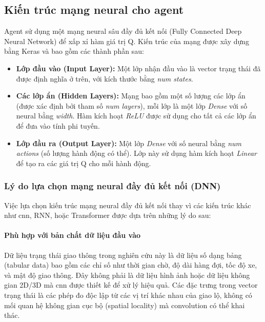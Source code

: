 \subsection{Kiến trúc mạng neural cho agent}

Agent sử dụng một mạng neural sâu đầy đủ kết nối (Fully Connected Deep Neural Network) để xấp xỉ hàm giá trị Q. Kiến trúc của mạng được xây dựng bằng Keras và bao gồm các
thành phần sau:

\begin{itemize}
    \item \textbf{Lớp đầu vào (Input Layer):} Một lớp nhận đầu vào là vector
        trạng thái đã được định nghĩa ở trên, với kích thước bằng \textit{num
        states}.

    \item \textbf{Các lớp ẩn (Hidden Layers):} Mạng bao gồm một số lượng các lớp
        ẩn (được xác định bởi tham số \textit{num layers}), mỗi lớp là một lớp
        \textit{Dense} với số neural bằng \textit{width}. Hàm kích hoạt \textit{ReLU}
        được sử dụng cho tất cả các lớp ẩn để đưa vào tính phi tuyến.

    \item \textbf{Lớp đầu ra (Output Layer):} Một lớp \textit{Dense} với số neural
        bằng \textit{num actions} (số lượng hành động có thể). Lớp này sử dụng hàm
        kích hoạt \textit{Linear} để tạo ra các giá trị Q cho mỗi hành động.
\end{itemize}

\subsubsection{Lý do lựa chọn mạng neural đầy đủ kết nối (DNN)}
Việc lựa chọn kiến trúc mạng neural đầy đủ kết nối thay vì các kiến trúc khác như \ac{cnn}, RNN, hoặc Transformer được dựa trên những lý do sau:

\paragraph{Phù hợp với bản chất dữ liệu đầu vào}
Dữ liệu trạng thái giao thông trong nghiên cứu này là dữ liệu số dạng bảng (tabular data) bao gồm các chỉ số như thời gian chờ, độ dài hàng đợi, tốc độ xe, và mật độ giao thông. Đây không phải là dữ liệu hình ảnh hoặc dữ liệu không gian 2D/3D mà \ac{cnn} được thiết kế để xử lý hiệu quả. Các đặc trưng trong vector trạng thái là các phép đo độc lập từ các vị trí khác nhau của giao lộ, không có mối quan hệ không gian cục bộ (spatial locality) mà convolution có thể khai thác.

